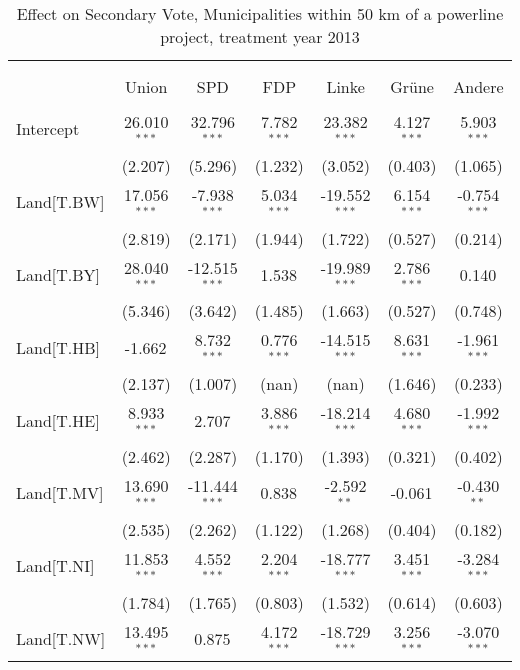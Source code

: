 \begin{table}[!htbp] \centering
  \caption{Effect on Secondary Vote, Municipalities within 50 km of a powerline project, treatment year 2013}
\begin{tabular}{@{\extracolsep{5pt}}lcccccc}
\\[-1.8ex]\hline
\hline \\[-1.8ex]
\\[-1.8ex] & \multicolumn{1}{c}{Union} & \multicolumn{1}{c}{SPD} & \multicolumn{1}{c}{FDP} & \multicolumn{1}{c}{Linke} & \multicolumn{1}{c}{Grüne} & \multicolumn{1}{c}{Andere}  \\
\hline \\[-1.8ex]
 Intercept & 26.010$^{***}$ & 32.796$^{***}$ & 7.782$^{***}$ & 23.382$^{***}$ & 4.127$^{***}$ & 5.903$^{***}$ \\
  & (2.207) & (5.296) & (1.232) & (3.052) & (0.403) & (1.065) \\
 Land[T.BW] & 17.056$^{***}$ & -7.938$^{***}$ & 5.034$^{***}$ & -19.552$^{***}$ & 6.154$^{***}$ & -0.754$^{***}$ \\
  & (2.819) & (2.171) & (1.944) & (1.722) & (0.527) & (0.214) \\
 Land[T.BY] & 28.040$^{***}$ & -12.515$^{***}$ & 1.538$^{}$ & -19.989$^{***}$ & 2.786$^{***}$ & 0.140$^{}$ \\
  & (5.346) & (3.642) & (1.485) & (1.663) & (0.527) & (0.748) \\
 Land[T.HB] & -1.662$^{}$ & 8.732$^{***}$ & 0.776$^{***}$ & -14.515$^{***}$ & 8.631$^{***}$ & -1.961$^{***}$ \\
  & (2.137) & (1.007) & (nan) & (nan) & (1.646) & (0.233) \\
 Land[T.HE] & 8.933$^{***}$ & 2.707$^{}$ & 3.886$^{***}$ & -18.214$^{***}$ & 4.680$^{***}$ & -1.992$^{***}$ \\
  & (2.462) & (2.287) & (1.170) & (1.393) & (0.321) & (0.402) \\
 Land[T.MV] & 13.690$^{***}$ & -11.444$^{***}$ & 0.838$^{}$ & -2.592$^{**}$ & -0.061$^{}$ & -0.430$^{**}$ \\
  & (2.535) & (2.262) & (1.122) & (1.268) & (0.404) & (0.182) \\
 Land[T.NI] & 11.853$^{***}$ & 4.552$^{***}$ & 2.204$^{***}$ & -18.777$^{***}$ & 3.451$^{***}$ & -3.284$^{***}$ \\
  & (1.784) & (1.765) & (0.803) & (1.532) & (0.614) & (0.603) \\
 Land[T.NW] & 13.495$^{***}$ & 0.875$^{}$ & 4.172$^{***}$ & -18.729$^{***}$ & 3.256$^{***}$ & -3.070$^{***}$ \\

\end{tabular}
\end{table}
